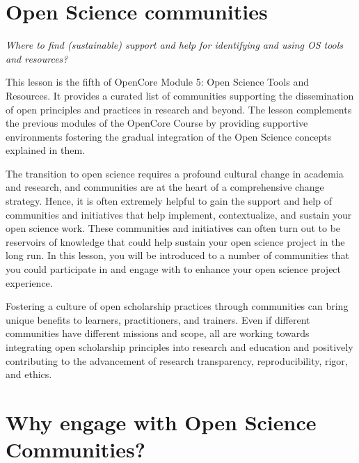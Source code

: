 \documentclass[
  letterpaper,
  DIV=11,
  numbers=noendperiod]{scrreport}
\begin{document}
\hypertarget{open-science-communities-1}{%
\section{Open Science communities}\label{open-science-communities-1}}

\emph{Where to find (sustainable) support and help for identifying and
using OS tools and resources?}

This lesson is the fifth of OpenCore Module 5: Open Science Tools and
Resources. It provides a curated list of communities supporting the
dissemination of open principles and practices in research and beyond.
The lesson complements the previous modules of the OpenCore Course by
providing supportive environments fostering the gradual integration of
the Open Science concepts explained in them.

The transition to open science requires a profound cultural change in
academia and research, and communities are at the heart of a
comprehensive change strategy. Hence, it is often extremely helpful to
gain the support and help of communities and initiatives that help
implement, contextualize, and sustain your open science work. These
communities and initiatives can often turn out to be reservoirs of
knowledge that could help sustain your open science project in the long
run. In this lesson, you will be introduced to a number of communities
that you could participate in and engage with to enhance your open
science project experience.

Fostering a culture of open scholarship practices through communities
can bring unique benefits to learners, practitioners, and trainers. Even
if different communities have different missions and scope, all are
working towards integrating open scholarship principles into research
and education and positively contributing to the advancement of research
transparency, reproducibility, rigor, and ethics.

\hypertarget{why-engage-with-open-science-communities}{%
\section{Why engage with Open Science
Communities?}\label{why-engage-with-open-science-communities}}
\end{document}
